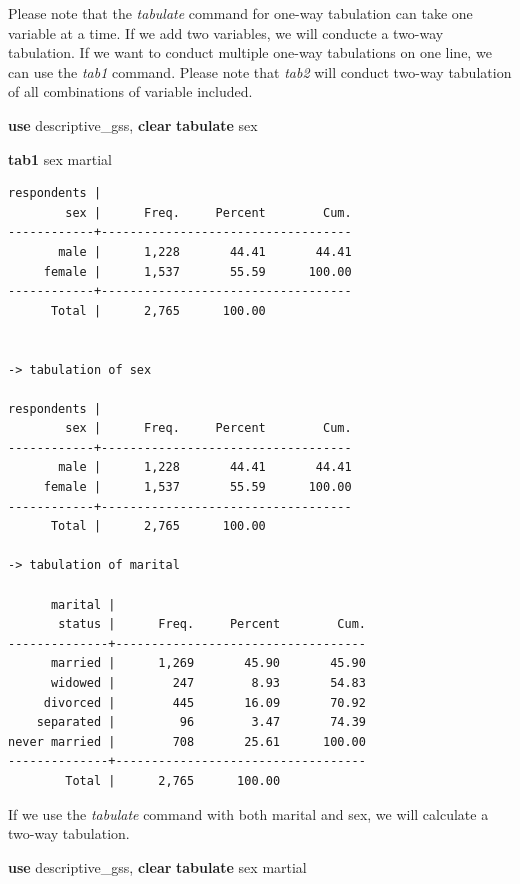 \documentclass[
]{book}
\newenvironment{Shaded}{\begin{snugshade}}{\end{snugshade}}
\newcommand{\KeywordTok}[1]{\textcolor[rgb]{0.13,0.29,0.53}{\textbf{#1}}}
\newcommand{\NormalTok}[1]{#1}
\begin{document}
Please note that the \emph{tabulate} command for one-way tabulation can take one variable at a time. If we add two variables, we will conducte a two-way tabulation. If we want to conduct multiple one-way tabulations on one line, we can use the \emph{tab1} command. Please note that \emph{tab2} will conduct two-way tabulation of all combinations of variable included.

\begin{Shaded}
\begin{Highlighting}[]
\KeywordTok{use}\NormalTok{ descriptive\_gss, }\KeywordTok{clear}
\KeywordTok{tabulate}\NormalTok{ sex}

\KeywordTok{tab1}\NormalTok{ sex martial}
\end{Highlighting}
\end{Shaded}

\begin{verbatim}
respondents |
        sex |      Freq.     Percent        Cum.
------------+-----------------------------------
       male |      1,228       44.41       44.41
     female |      1,537       55.59      100.00
------------+-----------------------------------
      Total |      2,765      100.00


-> tabulation of sex  

respondents |
        sex |      Freq.     Percent        Cum.
------------+-----------------------------------
       male |      1,228       44.41       44.41
     female |      1,537       55.59      100.00
------------+-----------------------------------
      Total |      2,765      100.00

-> tabulation of marital  

      marital |
       status |      Freq.     Percent        Cum.
--------------+-----------------------------------
      married |      1,269       45.90       45.90
      widowed |        247        8.93       54.83
     divorced |        445       16.09       70.92
    separated |         96        3.47       74.39
never married |        708       25.61      100.00
--------------+-----------------------------------
        Total |      2,765      100.00
\end{verbatim}

If we use the \emph{tabulate} command with both marital and sex, we will calculate a two-way tabulation.

\begin{Shaded}
\begin{Highlighting}[]
\KeywordTok{use}\NormalTok{ descriptive\_gss, }\KeywordTok{clear}
\KeywordTok{tabulate}\NormalTok{ sex martial}
\end{Highlighting}
\end{Shaded}
\end{document}
